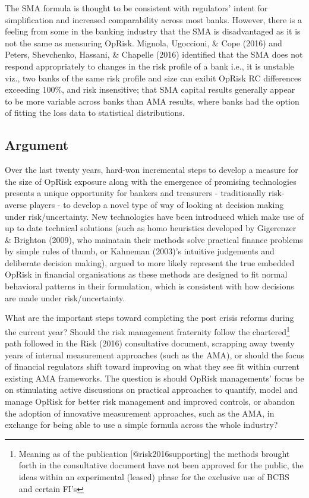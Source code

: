 \documentclass{DissertateUSU}
\begin{document}
The SMA formula is thought to be consistent with regulators' intent for
simplification and increased comparability across most banks. However,
there is a feeling from some in the banking industry that the SMA is
disadvantaged as it is not the same as measuring OpRisk. Mignola,
Ugoccioni, \& Cope (2016) and Peters, Shevchenko, Hassani, \& Chapelle
(2016) identified that the SMA does not respond appropriately to changes
in the risk profile of a bank i.e., it is unstable viz., two banks of
the same risk profile and size can exibit OpRisk RC differences
exceeding 100\%, and risk insensitive; that SMA capital results
generally appear to be more variable across banks than AMA results,
where banks had the option of fitting the loss data to statistical
distributions.

\subsection{Argument}
\label{ssec:Argument}

Over the last twenty years, hard-won incremental steps to develop a
measure for the size of OpRisk exposure along with the emergence of
promising technologies presents a unique opportunity for bankers and
treasurers - traditionally risk-averse players - to develop a novel type
of way of looking at decision making under risk/uncertainty. New
technologies have been introduced which make use of up to date technical
solutions (such as homo heuristics developed by Gigerenzer \& Brighton
(2009), who mainatain their methods solve practical finance problems by
simple rules of thumb, or Kahneman (2003)'s intuitive judgements and
deliberate decision making), argued to more likely represent the true
embedded OpRisk in financial organisations as these methods are designed
to fit normal behavioral patterns in their formulation, which is
consistent with how decisions are made under risk/uncertainty.\medskip 

What are the important steps toward completing the post crisis reforms
during the current year? Should the risk management fraternity follow
the
chartered\footnote{Meaning as of the publication [@risk2016supporting] the methods brought forth in the consultative document have not been approved for the public, the ideas within an experimental (leased) phase for the exclusive use of BCBS and certain FI's}
path followed in the Risk (2016) consultative document, scrapping away
twenty years of internal measurement approaches (such as the AMA), or
should the focus of financial regulators shift toward improving on what
they see fit within current existing AMA frameworks. The question is
should OpRisk managements' focus be on stimulating active discussions on
practical approaches to quantify, model and manage OpRisk for better
risk management and improved controls, or abandon the adoption of
innovative measurement approaches, such as the AMA, in exchange for
being able to use a simple formula across the whole industry?
\end{document}
